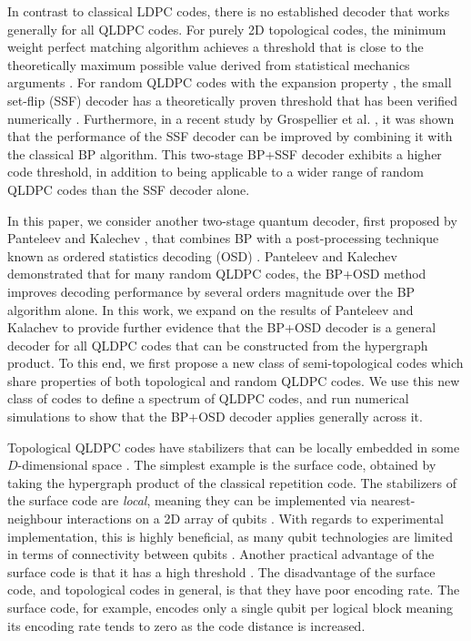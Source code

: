 \documentclass[%
 reprint,
superscriptaddress,
nofootinbib,
 amsmath,amssymb,
secnumarabic
]{revtex4-1}
\newcommand*{\etc}[1]{{#1}}
\begin{document}
In contrast to classical LDPC codes, there is no established decoder that works generally for all QLDPC codes. For purely 2D topological codes, the minimum weight perfect matching algorithm achieves a threshold \cite{Criger18} that is close to the theoretically maximum possible value derived from statistical mechanics arguments \cite{Dennis02}. For random QLDPC codes with the expansion property \cite{leverrier2015quantum,fawzi2018constant,fawzi2018efficient}, the small set-flip (SSF) decoder has a theoretically proven threshold \cite{fawzi2018constant} that has been verified numerically  \cite{grospellier2018numerical}. Furthermore, in a recent study by Grospellier et al. \cite{grospellier2020combining}, it was shown that the performance of the SSF decoder can be improved by combining it with the classical BP algorithm. This two-stage BP+SSF decoder exhibits a higher code threshold, in addition to being applicable to a wider range of random QLDPC codes than the SSF decoder alone. 

In this paper, we consider another two-stage quantum decoder, first proposed by Panteleev and Kalechev \cite{Panteleev_2019}, that combines BP with a post-processing technique known as ordered statistics decoding (OSD) \cite{Fossorier_1995,fossorier2001iterative}. Panteleev and Kalechev demonstrated that for many random QLDPC codes, the BP+OSD method improves decoding performance by several orders magnitude over the BP algorithm alone. In this work, we expand on the results of Panteleev and Kalachev to provide further evidence that the BP+OSD decoder is a general decoder for all QLDPC codes that can be constructed from the hypergraph product. To this end, we first propose a new class of semi-topological codes which share properties of both topological and random QLDPC codes. We use this new class of codes to define a spectrum of QLDPC codes, and run numerical simulations to show that the BP+OSD decoder applies generally across it.

Topological QLDPC codes have stabilizers \etc{that can be locally embedded in some $D$-dimensional space} \cite{Kitaev03}. The simplest example is the surface code, obtained by taking the hypergraph product of the classical repetition code. The stabilizers of the surface code are \textit{local}, meaning they can be implemented via nearest-neighbour interactions on a 2D array of qubits \cite{Kitaev03,Fowler12}. With regards to experimental implementation, this is highly beneficial, as many qubit technologies are limited in terms of connectivity between qubits \cite{Kelly16,Rigetti16,Takita17}. Another practical advantage of the surface code is that it has a high threshold \cite{Dennis02,Fowler12,Criger18}. The disadvantage of the surface code, and topological codes in general, is that they have poor encoding rate. The surface code, for example, encodes only a single qubit per logical block meaning its encoding rate tends to zero as the code distance is increased.
  
\end{document}
